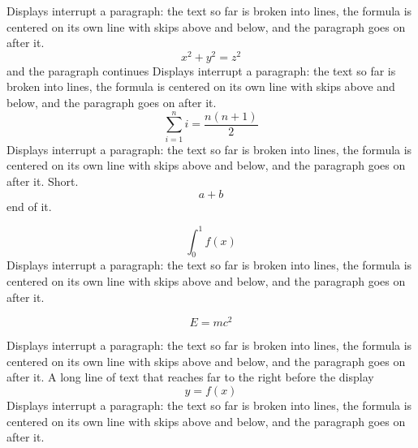 \documentclass{article}
\begin{document}
Displays interrupt a paragraph: the text so far is broken into lines, the formula is centered on its own line with skips above and below, and the paragraph goes on after it.
\[ x^2+y^2=z^2 \]
and the paragraph continues Displays interrupt a paragraph: the text so far is broken into lines, the formula is centered on its own line with skips above and below, and the paragraph goes on after it.
\begin{equation} \sum_{i=1}^n i = \frac{n(n+1)}{2} \end{equation}
Displays interrupt a paragraph: the text so far is broken into lines, the formula is centered on its own line with skips above and below, and the paragraph goes on after it. Short.
$$a+b$$
end of it.

\[ \int_0^1 f(x) \]
Displays interrupt a paragraph: the text so far is broken into lines, the formula is centered on its own line with skips above and below, and the paragraph goes on after it.

\begin{equation} E=mc^2 \end{equation}

Displays interrupt a paragraph: the text so far is broken into lines, the formula is centered on its own line with skips above and below, and the paragraph goes on after it. A long line of text that reaches far to the right before the display \begin{displaymath} y=f(x) \end{displaymath}
Displays interrupt a paragraph: the text so far is broken into lines, the formula is centered on its own line with skips above and below, and the paragraph goes on after it.
\end{document}
